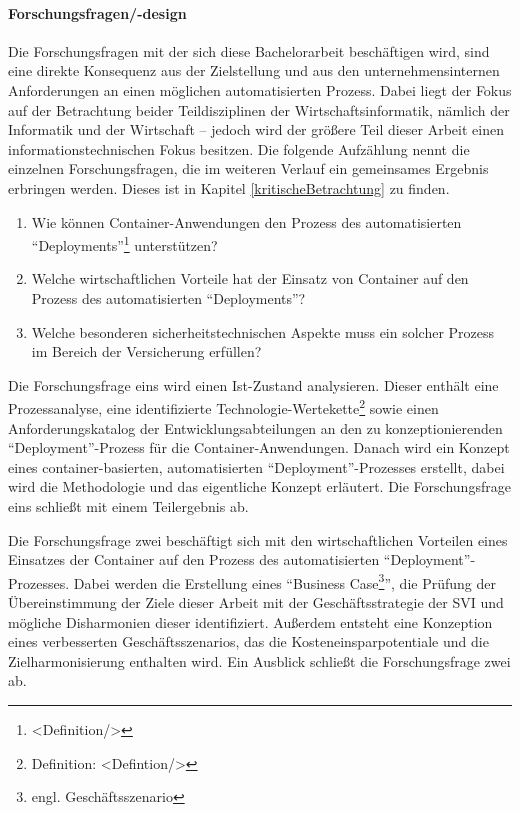 \paragraph{Forschungsfragen/-design}
Die Forschungsfragen mit der sich diese Bachelorarbeit beschäftigen wird, sind eine direkte Konsequenz aus der Zielstellung und aus den unternehmensinternen Anforderungen an einen möglichen automatisierten Prozess. Dabei liegt der Fokus auf der Betrachtung beider Teildisziplinen der Wirtschaftsinformatik, nämlich der Informatik und der Wirtschaft -- jedoch wird der größere Teil dieser Arbeit einen informationstechnischen Fokus besitzen. Die folgende Aufzählung nennt die einzelnen Forschungsfragen, die im weiteren Verlauf ein gemeinsames Ergebnis erbringen werden. Dieses ist in Kapitel \vref{kritischeBetrachtung} zu finden.
\begin{enumerate}
	\item Wie können Container-Anwendungen den Prozess des automatisierten \enquote{Deployments}\footnote{<Definition/>} unterstützen?
	\item Welche wirtschaftlichen Vorteile hat der Einsatz von Container auf den Prozess des automatisierten \enquote{Deployments}?
	\item Welche besonderen sicherheitstechnischen Aspekte muss ein solcher Prozess im Bereich der Versicherung erfüllen?
\end{enumerate}
Die Forschungsfrage eins wird einen Ist-Zustand analysieren. Dieser enthält eine Prozessanalyse, eine identifizierte Technologie-Wertekette\footnote{Definition: <Defintion/>} sowie einen Anforderungskatalog der Entwicklungsabteilungen an den zu konzeptionierenden \enquote{Deployment}-Prozess für die Container-Anwendungen. Danach wird ein Konzept eines container-basierten, automatisierten \enquote{Deployment}-Prozesses erstellt, dabei wird die Methodologie und das eigentliche Konzept erläutert. Die Forschungsfrage eins schließt mit einem Teilergebnis ab. \par
Die Forschungsfrage zwei beschäftigt sich mit den wirtschaftlichen Vorteilen eines Einsatzes der Container auf den Prozess des automatisierten \enquote{Deployment}-Prozesses. Dabei werden die Erstellung eines \enquote{Business Case\footnote{engl. Geschäftsszenario}}, die Prüfung der Übereinstimmung der Ziele dieser Arbeit mit der Geschäftsstrategie der \ac{SVI} und mögliche Disharmonien dieser identifiziert. Außerdem entsteht eine Konzeption eines verbesserten Geschäftsszenarios, das die Kosteneinsparpotentiale und die Zielharmonisierung enthalten wird. Ein Ausblick schließt die Forschungsfrage zwei ab. \par
